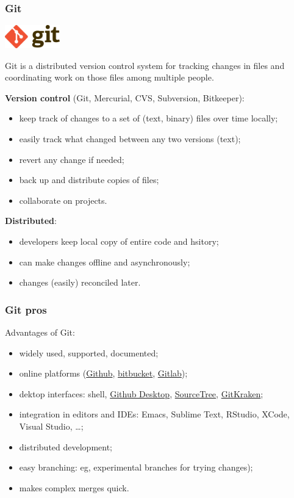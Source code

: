 \documentclass[10pt,svgnames,handout]{beamer}
\begin{document}
\begin{frame}
\frametitle{Git}
\includegraphics[height=1cm]{Git-logo}

Git is a distributed version control system for tracking changes in files and coordinating work on those files among multiple people.

\textbf{Version control} (Git, Mercurial, CVS, Subversion, Bitkeeper):
\begin{itemize}
   \item keep track of changes to a set of (text, binary) files over time locally;
   \item easily track what changed between any two versions (text);
   \item revert any change if needed;
   \item back up and distribute copies of files;
   \item collaborate on projects.
 \end{itemize} 

\textbf{Distributed}:
\begin{itemize}
  \item developers keep local copy of entire code and hsitory;
  \item can make changes offline and asynchronously;
  \item changes (easily) reconciled later.
\end{itemize}
\end{frame}


\begin{frame}
\frametitle{Git pros}

Advantages of Git:
\begin{itemize}
  \item widely used, supported, documented;
  \item online platforms (\href{https://github.com/}{Github}, \href{https://bitbucket.org/}{bitbucket}, \href{https://about.gitlab.com/}{Gitlab});
  \item dektop interfaces: shell, \href{https://desktop.github.com/}{Github Desktop}, \href{https://www.sourcetreeapp.com/}{SourceTree}, \href{https://www.gitkraken.com/}{GitKraken};
  \item integration in editors and IDEs: Emacs, Sublime Text, RStudio, XCode, Visual Studio, \ldots;
  \item distributed development;
  \item easy branching: eg, experimental branches for trying changes);
  \item makes complex merges quick.
\end{itemize}
\end{frame}
\end{document}
